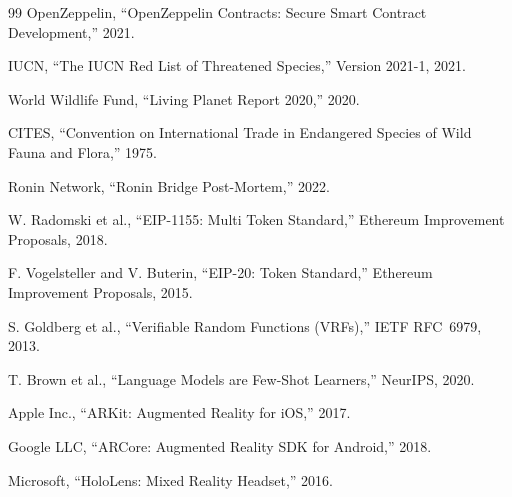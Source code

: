 \documentclass[11pt,letterpaper]{article}
\begin{document}
\begin{thebibliography}{99}
OpenZeppelin, ``OpenZeppelin Contracts: Secure Smart Contract Development,'' 2021.

IUCN, ``The IUCN Red List of Threatened Species,'' Version 2021-1, 2021.

World Wildlife Fund, ``Living Planet Report 2020,'' 2020.

CITES, ``Convention on International Trade in Endangered Species of Wild Fauna and Flora,'' 1975.

Ronin Network, ``Ronin Bridge Post-Mortem,'' 2022.

W. Radomski et al., ``EIP-1155: Multi Token Standard,'' Ethereum Improvement Proposals, 2018.

F. Vogelsteller and V. Buterin, ``EIP-20: Token Standard,'' Ethereum Improvement Proposals, 2015.

S. Goldberg et al., ``Verifiable Random Functions (VRFs),'' IETF RFC~6979, 2013.

T. Brown et al., ``Language Models are Few-Shot Learners,'' NeurIPS, 2020.

Apple Inc., ``ARKit: Augmented Reality for iOS,'' 2017.

Google LLC, ``ARCore: Augmented Reality SDK for Android,'' 2018.

Microsoft, ``HoloLens: Mixed Reality Headset,'' 2016.

\end{thebibliography}
\end{document}
